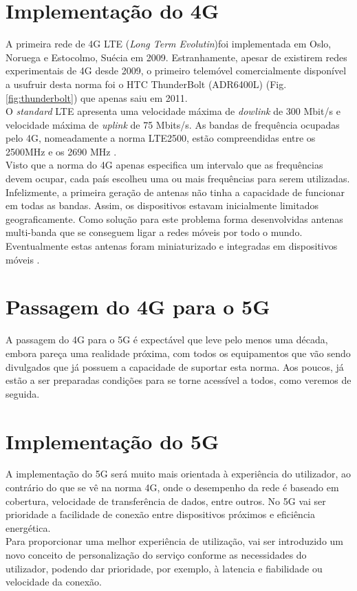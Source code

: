 \documentclass{llncs}
\begin{document}
\section{Implementação do 4G}
A primeira rede de 4G LTE (\textit{Long Term Evolutin})foi implementada
em Oslo, Noruega e Estocolmo, Suécia em 2009. 
Estranhamente, apesar de existirem redes experimentais de 4G desde
2009, o primeiro telemóvel comercialmente disponível a usufruir desta
norma foi o HTC ThunderBolt (ADR6400L) (Fig. \ref{fig:thunderbolt}) que 
apenas saiu em 2011.\\
O \textit{standard} LTE apresenta uma velocidade máxima 
de \textit{dowlink} de 300 Mbit/s e velocidade máxima de
\textit{uplink} de 75 Mbits/s.
As bandas de frequência ocupadas pelo 4G, nomeadamente a norma 
LTE2500,  estão compreendidas entre os 2500MHz e os 2690 MHz 
\cite{XinLi18}.\\
Visto que a norma do 4G apenas especifica um intervalo que as frequências
devem ocupar, cada país escolheu uma ou mais frequências para serem
utilizadas.
Infelizmente, a primeira geração de antenas não tinha a capacidade de
funcionar em todas as bandas. Assim, os dispositivos estavam inicialmente
limitados geograficamente. Como solução para este problema forma
desenvolvidas antenas multi-banda que se conseguem ligar a redes móveis
por todo o mundo. Eventualmente estas antenas foram miniaturizado e
integradas em dispositivos móveis \cite{XinLi18}.

\section{Passagem do 4G para o 5G}
A passagem do 4G para o 5G é expectável que leve pelo menos uma
década, embora pareça uma realidade próxima, com todos os 
equipamentos que vão sendo divulgados que já possuem a capacidade
de suportar esta norma. Aos poucos, já estão a ser preparadas
condições para se torne acessível a todos, como veremos de 
seguida.

\section{Implementação do 5G}
A implementação do 5G será muito mais orientada à experiência do
utilizador, ao contrário do que se vê na norma 4G, onde o 
desempenho da rede é baseado em cobertura, velocidade de 
transferência de dados, entre outros. No 5G vai ser prioridade a
facilidade de conexão entre dispositivos próximos e eficiência
energética.\\
Para proporcionar uma melhor experiência de utilização, vai ser
introduzido um novo conceito de personalização do serviço
conforme as necessidades do utilizador, podendo dar prioridade,
por exemplo, à latencia e fiabilidade ou velocidade da conexão.\\
\end{document}
